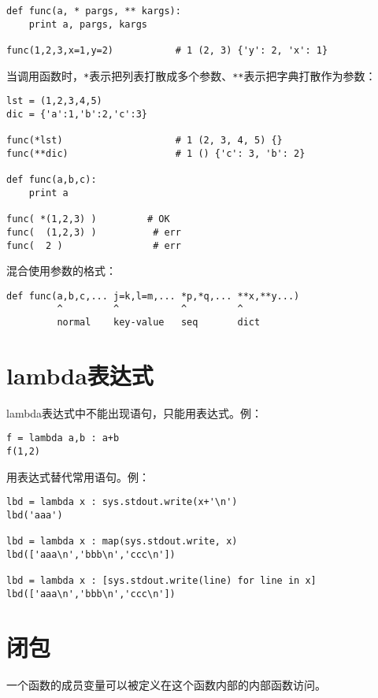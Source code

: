 \begin{lstlisting}
def func(a, * pargs, ** kargs):
    print a, pargs, kargs

func(1,2,3,x=1,y=2)           # 1 (2, 3) {'y': 2, 'x': 1}
\end{lstlisting}

			当调用函数时，\verb|*|表示把列表打散成多个参数、\verb|**|表示把字典打散作为参数：
\begin{lstlisting}
lst = (1,2,3,4,5)
dic = {'a':1,'b':2,'c':3}

func(*lst)                    # 1 (2, 3, 4, 5) {}
func(**dic)                   # 1 () {'c': 3, 'b': 2}

def func(a,b,c):
	print a

func( *(1,2,3) )         # OK
func(  (1,2,3) )          # err
func(  2 )                # err
\end{lstlisting}

			混合使用参数的格式：

\begin{lstlisting}
def func(a,b,c,... j=k,l=m,... *p,*q,... **x,**y...)
         ^         ^           ^         ^
         normal    key-value   seq       dict
\end{lstlisting}

	\section{lambda表达式}

		lambda表达式中不能出现语句，只能用表达式。例：

\begin{lstlisting}
f = lambda a,b : a+b
f(1,2)
\end{lstlisting}

		用表达式替代常用语句。例：

\begin{lstlisting}
lbd = lambda x : sys.stdout.write(x+'\n')
lbd('aaa')

lbd = lambda x : map(sys.stdout.write, x)
lbd(['aaa\n','bbb\n','ccc\n'])

lbd = lambda x : [sys.stdout.write(line) for line in x]
lbd(['aaa\n','bbb\n','ccc\n'])
\end{lstlisting}

	\section{闭包}

		一个函数的成员变量可以被定义在这个函数内部的内部函数访问。

